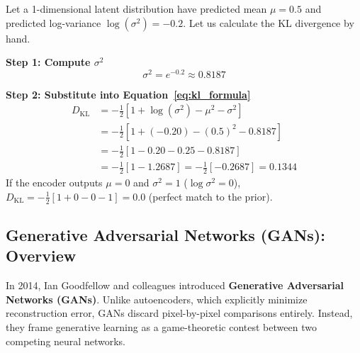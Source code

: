 \begin{example}
Let a 1-dimensional latent distribution have predicted mean $\mu = 0.5$ and predicted log-variance $\log(\sigma^2) = -0.2$. Let us calculate the KL divergence by hand.

\textbf{Step 1: Compute $\sigma^2$}
\begin{equation*}
\sigma^2 = e^{-0.2} \approx 0.8187
\end{equation*}

\textbf{Step 2: Substitute into Equation~\eqref{eq:kl_formula}}
\begin{align*}
D_{\text{KL}} &= -\frac{1}{2} \left[ 1 + \log(\sigma^2) - \mu^2 - \sigma^2 \right] \\
              &= -\frac{1}{2} \left[ 1 + (-0.20) - (0.5)^2 - 0.8187 \right] \\
              &= -\frac{1}{2} \left[ 1 - 0.20 - 0.25 - 0.8187 \right] \\
              &= -\frac{1}{2} \left[ 1 - 1.2687 \right] = -\frac{1}{2} \left[ -0.2687 \right] = \mathbf{0.1344}
\end{align*}
If the encoder outputs $\mu = 0$ and $\sigma^2 = 1$ ($\log\sigma^2 = 0$), $D_{\text{KL}} = -\frac{1}{2}[1 + 0 - 0 - 1] = 0.0$ (perfect match to the prior).
\end{example}

\subsection{Generative Adversarial Networks (GANs): Overview}\label{subsec:gans}

In 2014, Ian Goodfellow and colleagues introduced \textbf{Generative Adversarial Networks (GANs)}. Unlike autoencoders, which explicitly minimize reconstruction error, GANs discard pixel-by-pixel comparisons entirely. Instead, they frame generative learning as a game-theoretic contest between two competing neural networks.

